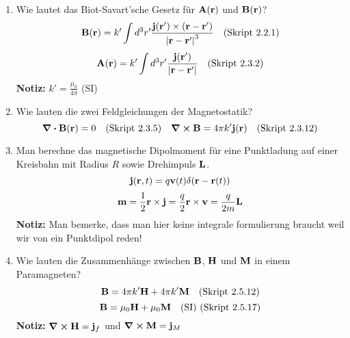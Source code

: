 \documentclass{scrartcl}
\newcommand{\rr}[1]{\frac{#1}{\abs{\vb{r}-\vb{r}'}}}
\newcommand{\ds}{\displaystyle}
\newcommand{\smref}[1]{\quad\text{(Skript #1)}}
\begin{document}
\begin{enumerate}
    \item Wie lautet das Biot-Savart'sche Gesetz für $\vb A(\vb r)$ und
          $\vb B(\vb r)$?
          $$\vb B(\vb r)=k'\int d^3r'\frac{\vb j(\vb r')\times
          (\vb r-\vb r')}{\abs{\vb r-\vb r'}^3}
          \quad \text{(Skript 2.2.1)}$$
          $$\vb A(\vb r)=k'\int d^3r'\rr{\vb j(\vb r')}
          \quad \text{(Skript 2.3.2)}$$
          \textbf{Notiz:} $k'=\frac{\mu_0}{4\pi}$ (SI)

    \item Wie lauten die zwei Feldgleichungen der Magnetostatik?
      $$\div \vb B(\vb r) = 0\smref{2.3.5}
      \quad \curl \vb B= 4\pi k'\vb j(\vb r)\smref{2.3.12}$$

    \item Man berechne das magnetische Dipolmoment für eine Punktladung auf
          einer Kreisbahn mit Radius $R$ sowie Drehimpuls $\vb L$.
          $$\vb j(\vb r,t)=q\vb v(t)\delta(\vb r-\vb r(t))$$
          $$\vb m = \frac{1}{2}\vb r \times \vb j=\frac{q}{2}\vb 
          r\times\vb v=\frac{q}{2m}\vb L$$
          \textbf{Notiz:} Man bemerke, dass man hier keine integrale 
          formulierung braucht weil wir von ein Punktdipol reden!

    \item Wie lauten die Zusammenhänge zwischen $\vb B$, $\vb H$ 
          und $\vb M$ in einem Paramagneten?
          $$\vb B = 4\pi k'\vb H + 4\pi k'\vb M\quad\text{(Skript 2.5.12)}$$
          $$\vb B = \mu_0 \vb H + \mu_0 \vb M \quad\text{(SI) 
          (Skript 2.5.17)}$$
          \textbf{Notiz:} $\ds \curl \vb H = \vb j_f$ und 
          $\ds \curl \vb M=\vb j_M$ 
  \end{enumerate}
  \newpage
\end{document}
